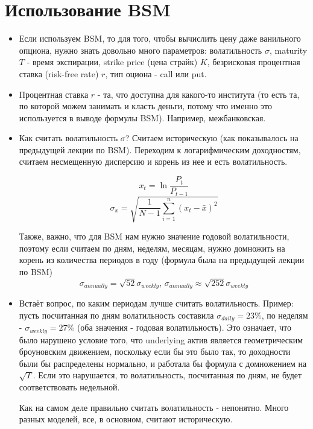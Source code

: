 \documentclass{article}
\begin{document}
\section{Использование BSM}
\begin{itemize}
     \item Если используем BSM, то для того, чтобы вычислить цену даже ванильного опциона, нужно знать довольно много параметров: волатильность \(\sigma\), maturity \(T\) - время экспирации, strike price (цена страйк) \(K\), безрисковая процентная ставка (risk-free rate)  \(r\), тип оциона - call или put. 
     
    \item Процентная ставка \(r\) - та, что доступна для какого-то института (то есть та, по которой можем занимать и класть деньги, потому что именно это используется в выводе формулы BSM). Например, межбанковская. 
    
    \item Как считать волатильность \(\sigma\)? Считаем историческую (как показывалось на предыдущей лекции по BSM). Переходим к логарифмическим доходностям, считаем несмещенную дисперсию и корень из нее и есть волатильность. 
    
    \[x_t = \ln{\frac{P_t}{P_{t-1}}}\]
    \[\sigma_x = \sqrt{\frac{1}{N-1} \sum_{i=1}^n (x_t - \bar x)^2}\]
    
    Также, важно, что для BSM нам нужно значение годовой волатильности, поэтому если считаем по дням, неделям, месяцам, нужно домножить на корень из количества периодов в году (формула была на предыдущей лекции по BSM)
    \[\sigma_{annually} = \sqrt{52}\sigma_{weekly}, \, \sigma_{annually} \approx \sqrt{252}\sigma_{weekly}\]
    
    \item Встаёт вопрос, по каким периодам лучше считать волатильность. Пример: пусть посчитанная по дням волатильность составила \(\sigma_{daily} = 23\%\), по неделям - \(\sigma_{weekly} = 27\%\) (оба значения - годовая волатильность). Это означает, что было нарушено условие того, что underlying актив является геометрическим броуновским движением, поскольку если бы это было так, то доходности были бы распределены нормально, и работала бы формула с домножением на \(\sqrt{T}\). Если это нарушается, то волатильность, посчитанная по дням, не будет соответствовать недельной. 
    
    Как на самом деле правильно считать волатильность - непонятно. Много разных моделей, все, в основном, считают историческую.

 \end{itemize}
\end{document}
